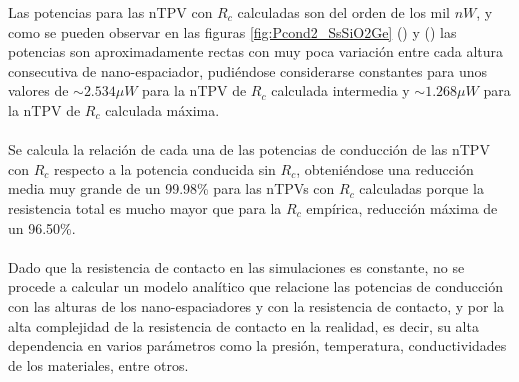 Las potencias para las nTPV con $R_c$ calculadas son del orden de los mil $n W$, y como se pueden observar en las figuras \ref{fig:Pcond2_SsSiO2Ge} () y () las potencias son aproximadamente rectas con muy poca variación entre cada altura consecutiva de nano-espaciador, pudiéndose considerarse constantes para unos valores de $\sim 2.534 \mu W$ para la nTPV de $R_c$ calculada intermedia y $\sim 1.268 \mu W$ para la nTPV de $R_c$ calculada máxima.\\\\
Se calcula la relación de cada una de las potencias de conducción de las nTPV con $R_c$ respecto a la potencia conducida sin $R_c$, obteniéndose una reducción media muy grande de un 99.98\% para las nTPVs con $R_c$ calculadas porque la resistencia total es mucho mayor que para la $R_c$ empírica, reducción máxima de un 96.50\%.\\\\
Dado que la resistencia de contacto en las simulaciones es constante, no se procede a calcular un modelo analítico que relacione las potencias de conducción con las alturas de los nano-espaciadores y con la resistencia de contacto, y por la alta complejidad de la resistencia de contacto en la realidad, es decir, su alta dependencia en varios parámetros como la presión, temperatura, conductividades de los materiales, entre otros.
